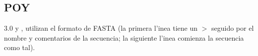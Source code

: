 \subsection{POY}
\noindent
{} 3.0 y , utilizan el formato de FASTA (la primera l'inea tiene un 
\begin{math}
>
\end{math}
seguido por el nombre y comentarios de la secuencia; la siguiente l'inea comienza la secuencia como tal).\\
\\
\noindent
{}
